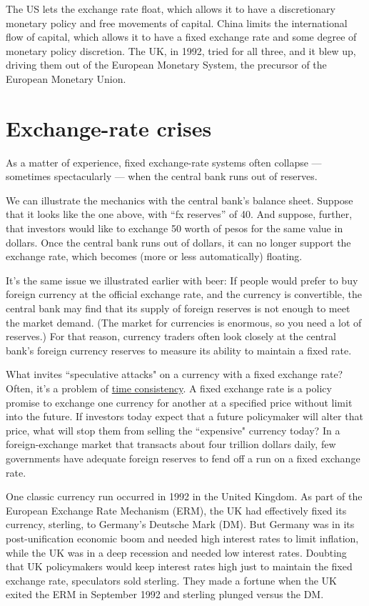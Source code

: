 The US lets the exchange rate float, which allows it to have a discretionary
monetary policy and free movements of capital.
China limits the international flow of capital,
which allows it to have a fixed exchange rate and some degree of monetary policy discretion.
The UK, in 1992, tried for all three, and it blew up, driving them out
of the European Monetary System, the precursor of the European Monetary Union.


\section{Exchange-rate crises}

As a matter of experience, fixed exchange-rate systems often collapse ---
sometimes spectacularly --- when the central bank runs out of reserves.

We can illustrate the mechanics with the central bank's balance sheet.
Suppose that it looks like the one above, with ``fx reserves'' of 40.
And suppose, further, that investors
would like to exchange 50 worth of pesos for the same value in dollars.
Once the central bank runs out of dollars, it can no longer support
the exchange rate, which becomes (more or less automatically) floating.

It's the same issue we illustrated earlier with beer: If people would prefer to buy foreign currency at the official
exchange rate,
and the currency is convertible,
the central bank may find that its supply of foreign reserves is not
enough to meet the market demand.
(The market for currencies is enormous, so you need a lot of reserves.)
For that reason, currency traders often look closely at the central bank's
foreign currency reserves to measure its ability to maintain a fixed rate.

What invites ``speculative attacks" on a currency with a fixed exchange
rate? Often, it's a problem of \hyperref[sec:time_cons]{time consistency}. A fixed exchange rate is a
policy promise to exchange one currency for another at a specified price
without limit into the future. If investors today expect that a future
policymaker will alter that price, what will stop them from selling the
``expensive" currency today? In a foreign-exchange market that transacts
about four trillion dollars daily, few governments have adequate foreign
reserves to fend off a run on a fixed exchange rate.

One classic currency run occurred in 1992 in the United Kingdom.
As part of the European Exchange Rate Mechanism (ERM), the UK had effectively
fixed its currency, sterling, to Germany's Deutsche Mark (DM).
But Germany was in its post-unification economic boom and needed
high interest rates to limit inflation, while the UK was in a deep recession
and needed low interest rates. Doubting that UK policymakers
would keep interest rates high just to maintain the fixed exchange rate,
speculators sold sterling. They made a fortune when the UK exited
the ERM in September 1992 and sterling plunged versus the DM.

